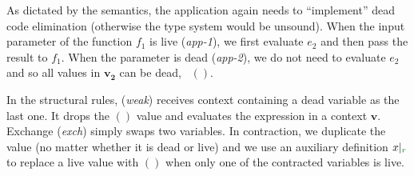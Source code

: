 As dictated by the semantics, the application again needs to ``implement'' dead code elimination
(otherwise the type system would be unsound). When the input parameter of the function $f_1$ is live
(\emph{app-1}), we first evaluate $e_2$ and then pass the result to $f_1$. When the parameter is
dead (\emph{app-2}), we do not need to evaluate $e_2$ and so all values in $\mathbf{v_2}$ can be
dead, \ie~$()$.

In the structural rules, (\emph{weak}) receives context containing a dead variable as the last one.
It drops the $()$ value and evaluates the expression in a context $\mathbf{v}$. Exchange (\emph{exch})
simply swaps two variables. In contraction, we duplicate the value (no matter whether it is dead
or live) and we use an auxiliary definition $\restr{x}{\cclrd{r}}$ to replace a live value with
$()$ when only one of the contracted variables is live.



